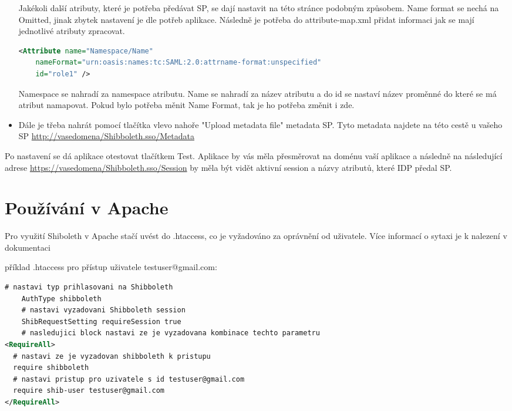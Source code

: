 \begin{itemize}
Jakékoli další atributy, které je potřeba předávat SP, se dají nastavit na této stránce podobným způsobem. Name format se nechá na Omitted, jinak zbytek nastavení je dle potřeb aplikace. Následně je potřeba do attribute-map.xml přidat informaci jak se mají jednotlivé atributy zpracovat.
   \begin{lstlisting}[language=XML]
     <Attribute name="Namespace/Name"
    nameFormat="urn:oasis:names:tc:SAML:2.0:attrname-format:unspecified"
    id="role1" />
    \end{lstlisting}
Namespace se nahradí za namespace atributu. Name se nahradí za název atributu a do id se nastaví název proměnné do které se má atribut namapovat. Pokud bylo potřeba měnit Name Format, tak je ho potřeba změnit i zde.\cite{AddAttribute}
    


    \item Dále je třeba nahrát pomocí tlačítka vlevo nahoře "Upload metadata file" metadata SP. Tyto metadata najdete na této cestě u vašeho SP \url{http://vasedomena/Shibboleth.sso/Metadata}

\end{itemize}

Po nastavení se dá aplikace otestovat tlačítkem Test. Aplikace by vás měla přesměrovat na doménu vaší aplikace a následně na následující adrese \url{https://vasedomena/Shibboleth.sso/Session} by měla být vidět aktivní session a názvy atributů, které IDP předal SP.

\section{Používání v Apache}

Pro využití Shiboleth v Apache stačí uvést do .htaccess, co je vyžadováno za oprávnění od uživatele. Více informací o sytaxi je k nalezení v dokumentaci\cite{SPApache}\cite{SPhtaccess} \linebreak

příklad .htaccess pro přístup uživatele testuser@gmail.com:

 \begin{lstlisting}[language=xml]
    # nastavi typ prihlasovani na Shibboleth
    AuthType shibboleth
    # nastavi vyzadovani Shibboleth session
    ShibRequestSetting requireSession true
    # nasledujici block nastavi ze je vyzadovana kombinace techto parametru
<RequireAll>
  # nastavi ze je vyzadovan shibboleth k pristupu
  require shibboleth 
  # nastavi pristup pro uzivatele s id testuser@gmail.com
  require shib-user testuser@gmail.com 
</RequireAll>
    \end{lstlisting}


